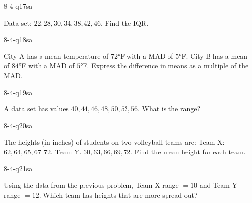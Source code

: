 \begin{practiceQuestion}{8-4-q17}{sa}
\begin{questionText}
Data set: $22, 28, 30, 34, 38, 42, 46$. Find the IQR.
\end{questionText}
\end{practiceQuestion}

\begin{practiceQuestion}{8-4-q18}{sa}
\begin{questionText}
City A has a mean temperature of $72°$F with a MAD of $5°$F. City B has a mean of $84°$F with a MAD of $5°$F. Express the difference in means as a multiple of the MAD.
\end{questionText}
\end{practiceQuestion}

\begin{practiceQuestion}{8-4-q19}{sa}
\begin{questionText}
A data set has values $40, 44, 46, 48, 50, 52, 56$. What is the range?
\end{questionText}
\end{practiceQuestion}

\begin{practiceQuestion}{8-4-q20}{sa}
\begin{questionText}
The heights (in inches) of students on two volleyball teams are:
Team X: $62, 64, 65, 67, 72$.
Team Y: $60, 63, 66, 69, 72$.
Find the mean height for each team.
\end{questionText}
\end{practiceQuestion}

\begin{practiceQuestion}{8-4-q21}{sa}
\begin{questionText}
Using the data from the previous problem, Team X range $= 10$ and Team Y range $= 12$. Which team has heights that are more spread out?
\end{questionText}
\end{practiceQuestion}

